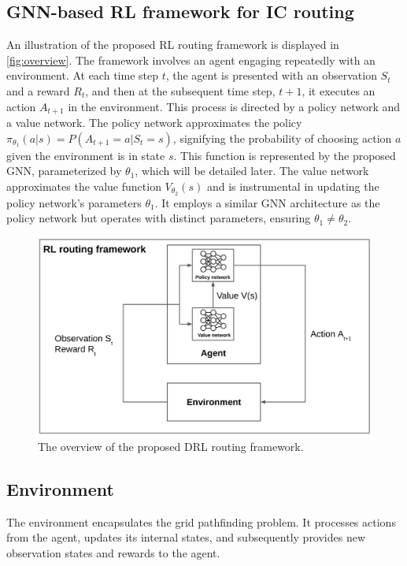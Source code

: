 \documentclass[letterpaper]{article}
\begin{document}
\subsection{GNN-based RL framework for IC routing}
An illustration of the proposed RL routing framework is displayed in \autoref{fig:overview}. The framework involves an agent engaging repeatedly with an environment. At each time step \(t\), the agent is presented with an observation \(S_{t}\) and a reward \(R_{t}\), and then at the subsequent time step, \(t+1\), it executes an action \(A_{t+1}\) in the environment. This process is directed by a policy network and a value network. The policy network approximates the policy \(\pi_{\theta_1}(a|s) = P(A_{t+1}=a|S_{t}=s)\), signifying the probability of choosing action \(a\) given the environment is in state \(s\). This function is represented by the proposed GNN, parameterized by \(\theta_1\), which will be detailed later. The value network approximates the value function \(V_{\theta_2}(s)\) and is instrumental in updating the policy network's parameters \(\theta_1\). It employs a similar GNN architecture as the policy network but operates with distinct parameters, ensuring \(\theta_1 \neq \theta_2\).

\begin{figure}[h!]
    \centering
    \includegraphics[width=\textwidth]{figure/overview.png}
    \caption{The overview of the proposed DRL routing framework.}
    \label{fig:overview}
\end{figure}


\subsection{Environment}
The environment encapsulates the grid pathfinding problem. It processes actions from the agent, updates its internal states, and subsequently provides new observation states and rewards to the agent.
\end{document}
